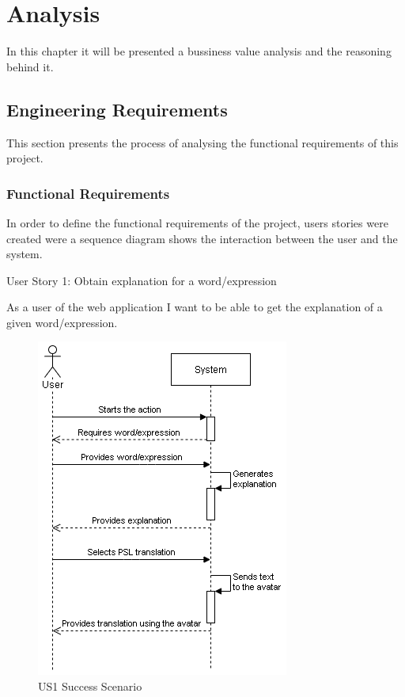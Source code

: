 
\chapter{Analysis} %
\label{chap:Chapter3} %

In this chapter it will be presented a bussiness value analysis and the reasoning behind it. 

\section{Engineering Requirements}

This section presents the process of analysing the functional requirements of this project.

\subsection{Functional Requirements}

In order to define the functional requirements of the project, users stories were created were a sequence diagram shows the interaction between the user and the system.

User Story 1: Obtain explanation for a word/expression

As a user of the web application I want to be able to get the explanation of a given word/expression.

\begin{figure}[H]
\centering
\includegraphics[scale=0.65]{ch3/assets/ssd.png}
\caption[US1 Success Scenario]{US1 Success Scenario}
\label{fig:ssd1}
\end{figure}


